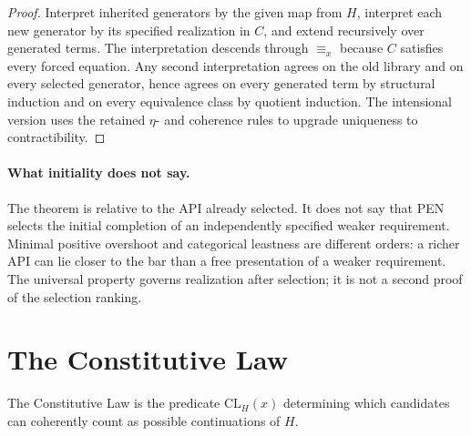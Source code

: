 \begin{proof}
Interpret inherited generators by the given map from \(H\), interpret each new
generator by its specified realization in \(C\), and extend recursively over
generated terms. The interpretation descends through \(\equiv_x\) because
\(C\) satisfies every forced equation. Any second interpretation agrees on the
old library and on every selected generator, hence agrees on every generated
term by structural induction and on every equivalence class by quotient
induction. The intensional version uses the retained \(\eta\)- and coherence
rules to upgrade uniqueness to contractibility.
\end{proof}

\paragraph{What initiality does not say.}
The theorem is relative to the API already selected. It does not say that PEN
selects the initial completion of an independently specified weaker
requirement. Minimal positive overshoot and categorical leastness are different
orders: a richer API can lie closer to the bar than a free presentation of a
weaker requirement. The universal property governs realization after
selection; it is not a second proof of the selection ranking.

\section{The Constitutive Law}

The Constitutive Law is the predicate \(\mathrm{CL}_H(x)\) determining which
candidates can coherently count as possible continuations of \(H\).

